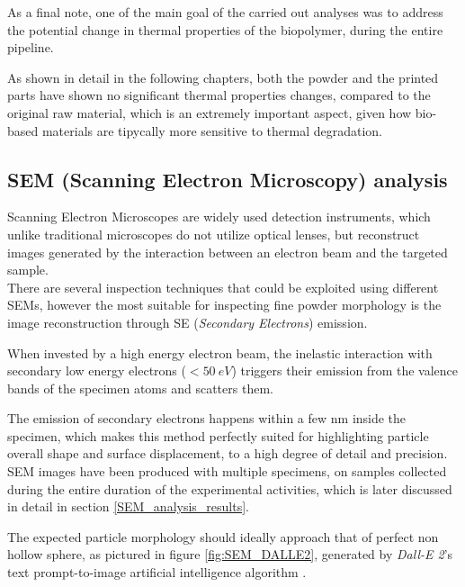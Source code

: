 \documentclass{article}
\begin{document}
    As a final note, one of the main goal of the carried out analyses was to address the potential change in thermal properties of the biopolymer, during the entire pipeline. 
    
    As shown in detail in the following chapters, both the powder and the printed parts have shown no significant thermal properties changes, compared to the 
    original raw material, which is an extremely important aspect, given how bio-based materials are tipycally more sensitive to thermal degradation. \\ 


    \clearpage
        \subsection{SEM (Scanning Electron Microscopy) analysis\label{SEM_analysis}}

        Scanning Electron Microscopes are widely used detection instruments, which unlike traditional microscopes 
        do not utilize optical lenses, but reconstruct images generated by the interaction between an electron beam and the targeted 
        sample. \\ 

        There are several inspection techniques that could be exploited using different SEMs, however the most suitable for inspecting 
        fine powder morphology is the image reconstruction through SE (\textit{Secondary Electrons}) emission. 

        When invested by a high energy electron beam, the inelastic interaction with secondary low energy electrons ($< 50 \ eV$) triggers their emission from the valence bands of the specimen atoms and scatters them. 

        The emission of secondary electrons happens within a few nm inside the specimen, which makes this method perfectly suited 
        for highlighting particle overall shape and surface displacement, to a high degree of detail and precision. \\

        SEM images have been produced with multiple specimens, on samples collected during the entire duration of the experimental 
        activities, which is later discussed in detail in section \ref{SEM_analysis_results}. 

        The expected particle morphology should ideally approach that of perfect non hollow sphere, as pictured in figure \ref{fig:SEM_DALLE2}, generated by \textit{Dall-E 2}'s 
        text prompt-to-image artificial intelligence algorithm \autocites{DALLE2}{DALLE2_roundparticles}. 
\end{document}
